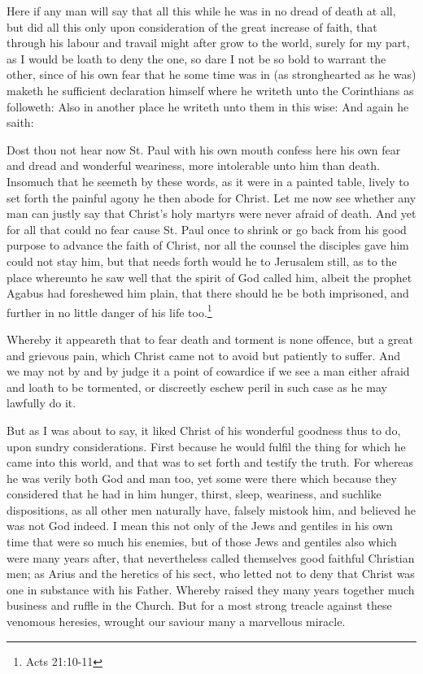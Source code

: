 \documentclass[a5paper]{scrbook}
\begin{document}
	Here if any man will say that all this while he was in no dread of death at all, but did all this only upon consideration of the great increase of faith, that through his labour and travail might after grow to the world, surely for my part, as I would be loath to deny the one, so dare I not be so bold to warrant the other, since of his own fear that he some time was in (as stronghearted as he was) maketh he sufficient declaration himself where he writeth unto the Corinthians as followeth:  Also in another place he writeth unto them in this wise:  And again he saith: 
	
	Dost thou not hear now St. Paul with his own mouth confess here his own fear and dread and	wonderful weariness, more intolerable unto him than death. Insomuch that he seemeth by these words, as it were in a painted table, lively to set forth the painful agony he then abode for Christ. Let me now see whether any man can justly say that Christ's holy martyrs were never afraid of death. And yet for all that could no fear cause St. Paul once to shrink or go back from his good purpose to advance the faith of Christ, nor all the counsel the disciples gave him could not stay him, but that needs forth would he to Jerusalem still, as to the place whereunto he saw well that the spirit of God called him, albeit the prophet Agabus had foreshewed him plain, that there should he be both imprisoned, and further in no little danger of his life too.\footnote{Acts 21:10-11}
	
	Whereby it appeareth that to fear death and torment is none offence, but a great and grievous pain, which Christ came not to avoid but patiently to suffer. And we may not by and by judge it a point of cowardice if we see a man either afraid and loath to be tormented, or discreetly eschew peril in such case as he may lawfully do it.
	
	But as I was about to say, it liked Christ of his wonderful goodness thus to do, upon sundry considerations. First because he would fulfil the thing for which he came into this world, and that was to set forth and testify the truth. For whereas he was verily both God and man too, yet some were there which because they considered that he had in him hunger, thirst, sleep, weariness, and suchlike dispositions, as all other men naturally have, falsely mistook him, and believed he was not God indeed. I mean this not only of the Jews and gentiles in his own time that were so much his enemies, but of those Jews and gentiles also which were many years after, that nevertheless called themselves good faithful Christian men; as Arius and the heretics of his sect, who letted not to deny that Christ was one in substance with his Father. Whereby raised they many years together much business and ruffle in the Church. But for a most strong treacle against these venomous heresies, wrought our saviour many a marvellous miracle.
	
\end{document}
